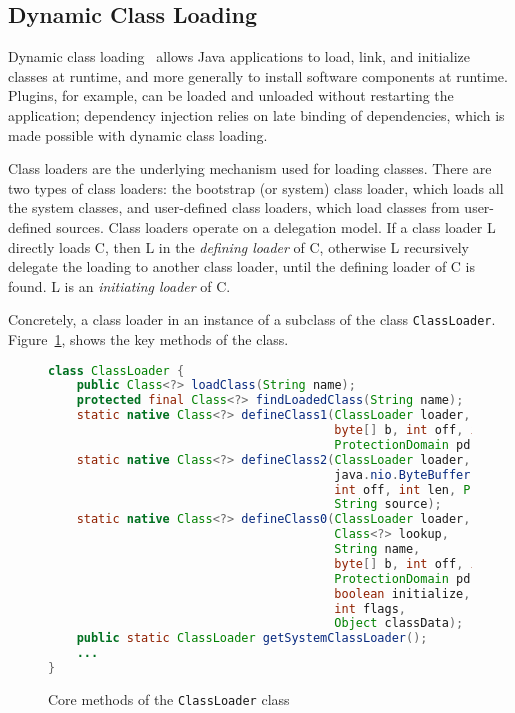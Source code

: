 \subsection{Dynamic Class Loading}
Dynamic class loading~\cite{liang_dynamic_nodate} allows Java applications to load, link, and initialize classes at runtime, and more generally to install software components at runtime. Plugins, for example, can be loaded and unloaded without restarting the application; dependency injection relies on late binding of dependencies, which is made possible with dynamic class loading. 

Class loaders are the underlying mechanism used for loading classes. 
There are two types of class loaders: the bootstrap (or system) class loader, which loads all the system classes, and user-defined class loaders, which load classes from user-defined sources.
Class loaders operate on a delegation model. If a class loader L directly loads C, then L in the \textit{defining loader} of C, otherwise L recursively delegate the loading to another class loader, until the defining loader of C is found. L is an \textit{initiating loader} of C. 

Concretely, a class loader in an instance of a subclass of the class \verb|ClassLoader|. 
Figure~\ref{fig:classloader}, shows the key methods of the class.

\begin{figure}[ht]
    \centering
\begin{lstlisting}[language=Java]
class ClassLoader {
    public Class<?> loadClass(String name);
    protected final Class<?> findLoadedClass(String name);
    static native Class<?> defineClass1(ClassLoader loader, String name, 
                                        byte[] b, int off, int len,
                                        ProtectionDomain pd, String source);
    static native Class<?> defineClass2(ClassLoader loader, String name, 
                                        java.nio.ByteBuffer b,
                                        int off, int len, ProtectionDomain pd,
                                        String source);
    static native Class<?> defineClass0(ClassLoader loader,
                                        Class<?> lookup,
                                        String name,
                                        byte[] b, int off, int len,
                                        ProtectionDomain pd,
                                        boolean initialize,
                                        int flags,
                                        Object classData);
    public static ClassLoader getSystemClassLoader();
    ...
}
\end{lstlisting}
    \caption{Core methods of the \texttt{ClassLoader} class}
    \label{fig:classloader}
\end{figure}


